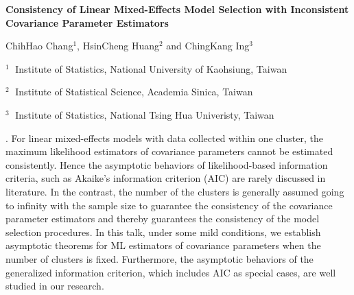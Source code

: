 \documentclass[12pt]{article}
\begin{document}
\begin{flushleft}


{\LARGE\bf  Consistency of Linear Mixed-Effects Model Selection with Inconsistent Covariance Parameter Estimators}


\vspace{1.0cm}

ChihHao Chang$^1$, HsinCheng Huang$^2$ and ChingKang Ing$^3$

\begin{description}

\item $^1 \;$ Institute of Statistics, National University of Kaohsiung, Taiwan

\item $^2 \;$ Institute of Statistical Science, Academia Sinica, Taiwan
\item $^3 \;$ Institute of Statistics, National Tsing Hua Univeristy, Taiwan

\end{description}

\end{flushleft}


\vspace{0.4cm}

.
For linear mixed-effects models with data collected within one
cluster, the maximum likelihood estimators of covariance
parameters cannot be estimated consistently. Hence the asymptotic
behaviors of likelihood-based information criteria, such as Akaike's
information criterion (AIC) are rarely discussed in literature. In the contrast,
the number of the clusters is generally assumed going to infinity
with the sample size to guarantee the consistency of the covariance
parameter estimators and thereby guarantees the consistency of the
model selection procedures. In this talk, under some mild
conditions, we establish asymptotic theorems for ML estimators of
covariance parameters when the number of clusters is fixed.
Furthermore, the asymptotic behaviors of the generalized information
criterion, which includes AIC as special cases, are
well studied in our research.

\vskip 2mm
\end{document}

